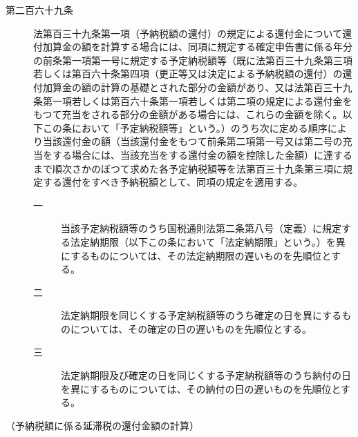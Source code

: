 \documentclass[twocolumn,a4j,10pt]{ltjtarticle}
\begin{document}
\begin{description}
\item[第二百六十九条]法第百三十九条第一項（予納税額の還付）の規定による還付金について還付加算金の額を計算する場合には、同項に規定する確定申告書に係る年分の前条第一項第一号に規定する予定納税額等（既に法第百三十九条第三項若しくは第百六十条第四項（更正等又は決定による予納税額の還付）の還付加算金の額の計算の基礎とされた部分の金額があり、又は法第百三十九条第一項若しくは第百六十条第一項若しくは第二項の規定による還付金をもつて充当をされる部分の金額がある場合には、これらの金額を除く。以下この条において「予定納税額等」という。）のうち次に定める順序により当該還付金の額（当該還付金をもつて前条第二項第一号又は第二号の充当をする場合には、当該充当をする還付金の額を控除した金額）に達するまで順次さかのぼつて求めた各予定納税額等を法第百三十九条第三項に規定する還付をすべき予納税額として、同項の規定を適用する。
\begin{description}
\item[一]当該予定納税額等のうち国税通則法第二条第八号（定義）に規定する法定納期限（以下この条において「法定納期限」という。）を異にするものについては、その法定納期限の遅いものを先順位とする。
\item[二]法定納期限を同じくする予定納税額等のうち確定の日を異にするものについては、その確定の日の遅いものを先順位とする。
\item[三]法定納期限及び確定の日を同じくする予定納税額等のうち納付の日を異にするものについては、その納付の日の遅いものを先順位とする。
\end{description}
\end{description}
\noindent\hspace{10pt}（予納税額に係る延滞税の還付金額の計算）
\end{document}
